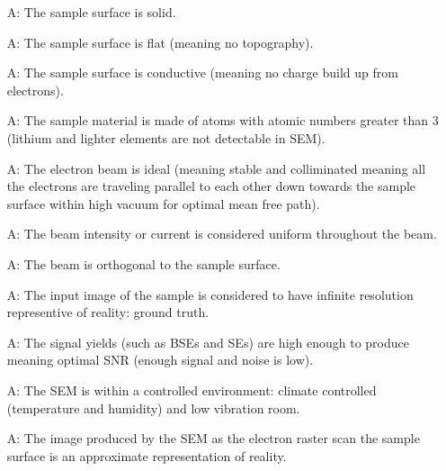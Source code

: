 \documentclass[12pt]{article}
\newcounter{assumpnum} %
\begin{document}
\begin{itemize}

\item[A\refstepcounter{assumpnum}\theassumpnum \label{A_sample}:] The sample 
surface is solid.

\item[A\refstepcounter{assumpnum}\theassumpnum \label{A_sample}:] The sample 
surface is flat (meaning no topography).

\item[A\refstepcounter{assumpnum}\theassumpnum \label{A_sample}:] The sample 
surface is conductive (meaning no charge build up from electrons).

\item[A\refstepcounter{assumpnum}\theassumpnum \label{A_sample}:] The sample 
material is made of atoms with atomic numbers greater than 3 (lithium and lighter elements are not detectable in SEM).

\item[A\refstepcounter{assumpnum}\theassumpnum \label{A_beam}:] The electron 
beam is ideal (meaning stable and colliminated meaning all the electrons are 
traveling parallel to each other down towards the sample surface within high 
vacuum for optimal mean free path).

\item[A\refstepcounter{assumpnum}\theassumpnum \label{A_beam1}:] The beam 
intensity or current is considered uniform throughout the beam.

\item[A\refstepcounter{assumpnum}\theassumpnum \label{A_beam2}:] The beam is orthogonal to the sample surface.

\item[A\refstepcounter{assumpnum}\theassumpnum \label{A_inputImage}:] The input 
image of the sample is considered to have infinite resolution representive of reality: ground truth.

\item[A\refstepcounter{assumpnum}\theassumpnum \label{A_yield}:] The signal yields (such as BSEs and SEs) are high enough to produce meaning optimal SNR (enough signal and noise is low).

\item[A\refstepcounter{assumpnum}\theassumpnum \label{A_environment}:] The SEM 
is within a controlled environment: climate controlled (temperature and 
humidity) and low vibration room.

\item[A\refstepcounter{assumpnum}\theassumpnum \label{A_reality}:] The image 
produced by the SEM as the electron raster scan the sample surface is an 
approximate representation of reality.

\end{itemize}
\end{document}
